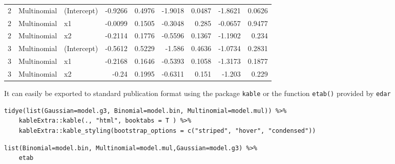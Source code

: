 \documentclass[a4paper]{article}
\begin{document}
\begin{center}
\begin{tabular}{lllrrrrrr}
2 & Multinomial & (Intercept) & -0.9266 & 0.4976 & -1.9018 & 0.0487 & -1.8621 & 0.0626\\
2 & Multinomial & x1 & -0.0099 & 0.1505 & -0.3048 & 0.285 & -0.0657 & 0.9477\\
2 & Multinomial & x2 & -0.2114 & 0.1776 & -0.5596 & 0.1367 & -1.1902 & 0.234\\
3 & Multinomial & (Intercept) & -0.5612 & 0.5229 & -1.586 & 0.4636 & -1.0734 & 0.2831\\
3 & Multinomial & x1 & -0.2168 & 0.1646 & -0.5393 & 0.1058 & -1.3173 & 0.1877\\
3 & Multinomial & x2 & -0.24 & 0.1995 & -0.6311 & 0.151 & -1.203 & 0.229\\
\end{tabular}
\end{center}



It can easily be exported to standard publication format using the package \texttt{kable} or the function \texttt{etab()} provided by \texttt{edar}

\lstset{numbers=left,language=r,label= ,caption= ,captionpos=b}
\begin{lstlisting}
tidye(list(Gaussian=model.g3, Binomial=model.bin, Multinomial=model.mul)) %>%
    kableExtra::kable(., "html", booktabs = T ) %>%
    kableExtra::kable_styling(bootstrap_options = c("striped", "hover", "condensed"))

\end{lstlisting}

\lstset{numbers=left,language=r,label= ,caption= ,captionpos=b}
\begin{lstlisting}
list(Binomial=model.bin, Multinomial=model.mul,Gaussian=model.g3) %>%
    etab
\end{lstlisting}
\end{document}
